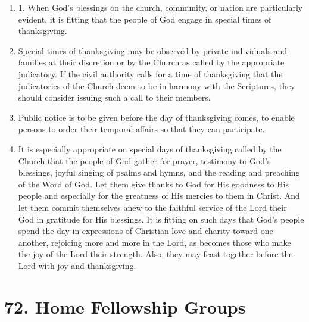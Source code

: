 \documentclass[
]{book}
\providecommand{\tightlist}{%
  \setlength{\itemsep}{0pt}\setlength{\parskip}{0pt}}
\begin{document}
\begin{enumerate}
\def\labelenumi{\arabic{enumi}.}
\tightlist
\item
  \protect\hypertarget{71}{\href{}{}}1. When God's blessings on the church, community, or nation are particularly evident, it is fitting that the people of God engage in special times of thanksgiving.
\item
  Special times of thanksgiving may be observed by private individuals and families at their discretion or by the Church as called by the appropriate judicatory. If the civil authority calls for a time of thanksgiving that the judicatories of the Church deem to be in harmony with the Scriptures, they should consider issuing such a call to their members.
\item
  Public notice is to be given before the day of thanksgiving comes, to enable persons to order their temporal affairs so that they can participate.
\item
  It is especially appropriate on special days of thanksgiving called by the Church that the people of God gather for prayer, testimony to God's blessings, joyful singing of psalms and hymns, and the reading and preaching of the Word of God. Let them give thanks to God for His goodness to His people and especially for the greatness of His mercies to them in Christ. And let them commit themselves anew to the faithful service of the Lord their God in gratitude for His blessings. It is fitting on such days that God's people spend the day in expressions of Christian love and charity toward one another, rejoicing more and more in the Lord, as becomes those who make the joy of the Lord their strength. Also, they may feast together before the Lord with joy and thanksgiving.
\end{enumerate}

\hypertarget{home-fellowship-groups}{%
\section*{72. Home Fellowship Groups}\label{home-fellowship-groups}}

\protect\hypertarget{chapter-slug-72-home-fellowship-groups}{\href{}{}}
\end{document}
